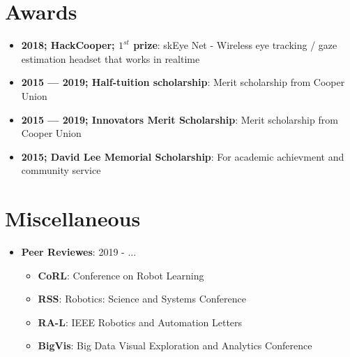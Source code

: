 \documentclass[letterpaper,11pt]{article}
\newcommand{\resumeItem}[2]{
\item\small{
		\textbf{#1}{: #2 \vspace{-2pt}}
	}
}
\newcommand{\resumeSubItem}[2]{\resumeItem{#1}{#2}\vspace{-4pt}}
\newcommand{\resumeSubHeadingListStart}{\begin{itemize}[leftmargin=*,label=]}
\newcommand{\resumeSubHeadingListEnd}{\end{itemize}}
\newcommand{\resumeItemListStart}{\begin{itemize}[label=$\bullet$]}
\newcommand{\resumeItemListEnd}{\end{itemize}\vspace{-5pt}}
\begin{document}
\section{Awards}
\resumeSubHeadingListStart
\resumeSubItem{2018; HackCooper; $1^{st}$ prize}
{skEye Net - Wireless eye tracking / gaze estimation headset that works in realtime}
\resumeSubItem{2015 --- 2019; Half-tuition scholarship}{Merit scholarship from Cooper Union}
\resumeSubItem{2015 --- 2019; Innovators Merit Scholarship}{Merit scholarship from Cooper Union}
\resumeSubItem{2015; David Lee Memorial Scholarship}{For academic achievment and community service}
\resumeSubHeadingListEnd

\section{Miscellaneous}
\resumeSubHeadingListStart
\resumeSubItem{Peer Reviewes}{2019 - ...}
\resumeItemListStart
\resumeItem{CoRL}{Conference on Robot Learning}
\resumeItem{RSS}{Robotics: Science and Systems Conference}
\resumeItem{RA-L}{IEEE Robotics and Automation Letters}
\resumeItem{BigVis}{Big Data Visual Exploration and Analytics Conference}

\resumeItemListEnd
\resumeSubHeadingListEnd

\end{document}
